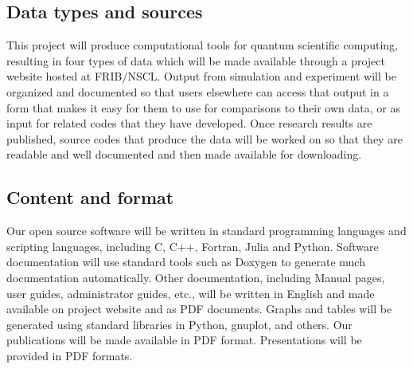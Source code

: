 \documentclass[10pt]{article}
\begin{document}
\subsection{Data types and sources}
This project will produce computational tools for quantum scientific computing, resulting in four
types of data which will be made available through a project website hosted at FRIB/NSCL. Output from
simulation and experiment will be organized and documented so that users elsewhere can access
that output in a form that makes it easy for them to use for comparisons to their own data, or as
input for related codes that they have developed. Once research results are published, source codes
that produce the data will be worked on so that they are readable and well documented and then
made available for downloading.
\subsection{Content and format}
Our open source software will be written in standard programming languages and scripting languages,
including C, C++, Fortran, Julia and Python. Software documentation will use standard
tools such as Doxygen to generate much documentation automatically. Other
documentation, including Manual pages, user guides, administrator guides, etc., will be written in
English and made available on project website and as PDF documents. Graphs and tables will be
generated using standard libraries in Python, gnuplot, and others. Our publications will be made
available in PDF format. Presentations will be provided in PDF formats.
\end{document}
